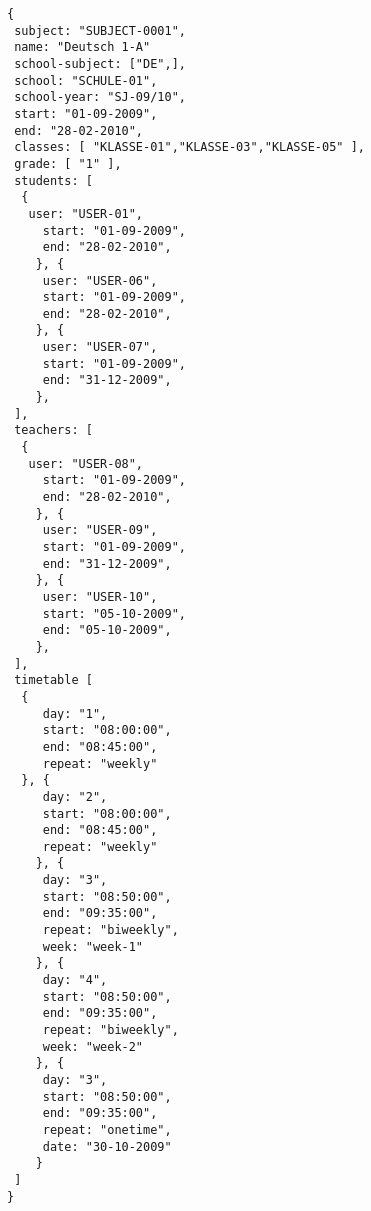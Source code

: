 
\begin{lstlisting}[caption={Beispiel eines Schulfachs},frame=tlrb]
{
 subject: "SUBJECT-0001",
 name: "Deutsch 1-A"
 school-subject: ["DE",],
 school: "SCHULE-01",
 school-year: "SJ-09/10",
 start: "01-09-2009",
 end: "28-02-2010",
 classes: [ "KLASSE-01","KLASSE-03","KLASSE-05" ],
 grade: [ "1" ],
 students: [
  { 
   user: "USER-01",
	 start: "01-09-2009",
	 end: "28-02-2010",
	}, { 
	 user: "USER-06",
	 start: "01-09-2009",
	 end: "28-02-2010",
	}, { 
	 user: "USER-07",
	 start: "01-09-2009",
	 end: "31-12-2009",
	},
 ],
 teachers: [
  { 
   user: "USER-08",
	 start: "01-09-2009",
	 end: "28-02-2010",
	}, { 
	 user: "USER-09",
	 start: "01-09-2009",
	 end: "31-12-2009",
	}, { 
	 user: "USER-10",
	 start: "05-10-2009",
	 end: "05-10-2009",
	},
 ],
 timetable [
  {
	 day: "1",
	 start: "08:00:00",
	 end: "08:45:00",
	 repeat: "weekly"
  }, {
	 day: "2",
	 start: "08:00:00",
	 end: "08:45:00",
	 repeat: "weekly"
	}, {
	 day: "3",
	 start: "08:50:00",
	 end: "09:35:00",
	 repeat: "biweekly",
	 week: "week-1"
	}, {
	 day: "4",
	 start: "08:50:00",
	 end: "09:35:00",
	 repeat: "biweekly",
	 week: "week-2"
	}, {
	 day: "3",
	 start: "08:50:00",
	 end: "09:35:00",
	 repeat: "onetime",
	 date: "30-10-2009"
	}	 
 ]
}
\end{lstlisting}